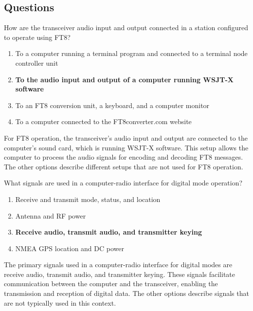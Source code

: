 \subsection*{Questions}
\begin{tcolorbox}[colback=gray!10!white,colframe=black!75!black,title={T4A04}]
    How are the transceiver audio input and output connected in a station configured to operate using FT8?
    \begin{enumerate}[label=\Alph*,noitemsep]
        \item To a computer running a terminal program and connected to a terminal node controller unit
        \item \textbf{To the audio input and output of a computer running WSJT-X software}
        \item To an FT8 conversion unit, a keyboard, and a computer monitor
        \item To a computer connected to the FT8converter.com website
    \end{enumerate}
\end{tcolorbox}
For FT8 operation, the transceiver's audio input and output are connected to the computer's sound card, which is running WSJT-X software. This setup allows the computer to process the audio signals for encoding and decoding FT8 messages. The other options describe different setups that are not used for FT8 operation.


\begin{tcolorbox}[colback=gray!10!white,colframe=black!75!black,title={T4A06}]
    What signals are used in a computer-radio interface for digital mode operation?
    \begin{enumerate}[label=\Alph*,noitemsep]
        \item Receive and transmit mode, status, and location
        \item Antenna and RF power
        \item \textbf{Receive audio, transmit audio, and transmitter keying}
        \item NMEA GPS location and DC power
    \end{enumerate}
\end{tcolorbox}
The primary signals used in a computer-radio interface for digital modes are receive audio, transmit audio, and transmitter keying. These signals facilitate communication between the computer and the transceiver, enabling the transmission and reception of digital data. The other options describe signals that are not typically used in this context.

